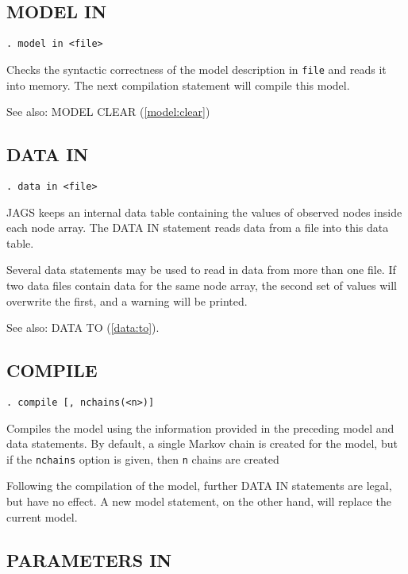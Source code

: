 \documentclass[11pt, a4paper, titlepage]{report}
\begin{document}
\subsection{MODEL IN}

\begin{verbatim}
. model in <file>
\end{verbatim}
Checks the syntactic correctness of the model description in
\texttt{file} and reads it into memory. The next compilation
statement will compile this model. 

See also: MODEL CLEAR (\ref{model:clear})

\subsection{DATA IN}
\label{data:in}

\begin{verbatim}
. data in <file>
\end{verbatim}
JAGS keeps an internal data table containing the values of observed
nodes inside each node array.  The DATA IN statement reads data from a
file into this data table.

Several data statements may be used to read in data from more than one
file. If two data files contain data for the same node array, the second
set of values will overwrite the first, and a warning will be printed.

See also: DATA TO (\ref{data:to}).

\subsection{COMPILE}

\begin{verbatim}
. compile [, nchains(<n>)]
\end{verbatim}
Compiles the model using the information provided in the preceding
model and data statements. By default, a single Markov chain is
created for the model, but if the \texttt{nchains} option is given,
then \texttt{n} chains are created 

Following the compilation of the model, further DATA IN statements are
legal, but have no effect.  A new model statement, on the other hand,
will replace the current model.

\subsection{PARAMETERS IN}
\label{parameters:in}
\end{document}
